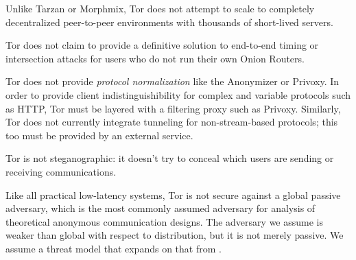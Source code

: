 \documentclass[times,10pt,twocolumn]{article}
\begin{document}
Unlike Tarzan or Morphmix, Tor does not attempt to scale to completely
decentralized peer-to-peer environments with thousands of short-lived
servers. 

Tor does not claim to provide a definitive solution to end-to-end
timing or intersection attacks for users who do not run their own
Onion Routers.

Tor does not provide \emph{protocol normalization} like the Anonymizer or
Privoxy.  In order to provide client indistinguishibility for
complex and variable protocols such as HTTP, Tor must be layered with
a filtering proxy such as Privoxy.  Similarly, Tor does not currently
integrate tunneling for non-stream-based protocols; this too must be
provided by an external service.

Tor is not steganographic: it doesn't try to conceal which users are
sending or receiving communications.


\label{subsec:adversary-model}

Like all practical low-latency systems, Tor is not secure against a
global passive adversary, which is the most commonly assumed adversary
for analysis of theoretical anonymous communication designs. The adversary
we assume
is weaker than global with respect to distribution, but it is not
merely passive.
We assume a threat model that expands on that from \cite{or-pet00}.
\end{document}
